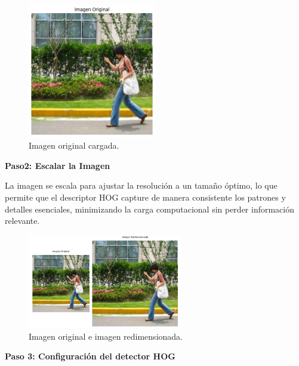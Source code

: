 \documentclass[a4paper]{article}
\begin{document}
\begin{figure}[H]
    \centering
    \includegraphics[width=0.5\textwidth]{images/hog_paso_1.png}
    \caption{Imagen original cargada.}
\end{figure}

\textbf{Paso2: Escalar la Imagen}
\par\vspace{0.5cm}

La imagen se escala para ajustar la resolución a un tamaño óptimo, lo que permite que el descriptor HOG capture de manera consistente los patrones y detalles esenciales, minimizando la carga computacional sin perder información relevante.

\begin{figure}[H]
    \centering
    \includegraphics[width=0.6\textwidth]{images/hog_paso_2.png}
    \caption{Imagen original e imagen redimensionada.}
\end{figure}

\textbf{Paso 3: Configuración del detector HOG}
\par\vspace{0.5cm}
\end{document}
